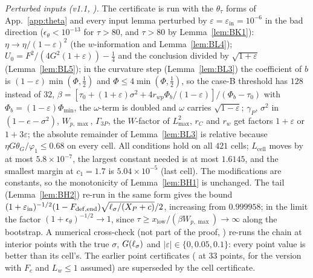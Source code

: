 \emph{Perturbed inputs (v1.1, ).} The certificate is run with the $\theta_\tau$ forms of App.~\ref{app:theta} and every input lemma
perturbed by $\varepsilon=\varepsilon_{\mathrm{in}}=10^{-6}$ in the bad direction ($\epsilon_\theta<10^{-13}$ for $\tau>80$, and $\tau>80$ by Lemma~\ref{lem:BK1}):
$\eta\to\eta/(1-\varepsilon)^2$ (the $w$-information and Lemma~\ref{lem:BL4}); $U_0=F^2/(4G^2(1+\varepsilon))-\frac14$ and the conclusion divided by
$\sqrt{1+\varepsilon}$ (Lemma~\ref{lem:BL5}); in the curvature step (Lemma~\ref{lem:BL3}) the coefficient of $b$ is $(1-\varepsilon)\min(\Phi,\frac12)$ and
$\Phi\le4\min(\Phi,\frac12)$, so the case-B threshold has $128$ instead of $32$, $\beta=[\tau_0+(1+\varepsilon)\sigma^2+4r_{wp}\Phi_{b}/(1-\varepsilon)]/(\Phi_b-\tau_0)$
with $\Phi_b=(1-\varepsilon)\Phi_{\min}$, the $\omega$-term is doubled and $\omega$ carries $\sqrt{1-\varepsilon}$; $\gamma_P$, $\sigma^2$ in $(1-e-\sigma^2)$, $W_{p,\max}$,
$\Gamma_{3P}$, the $W$-factor of $L^2_{\max}$, $r_C$ and $r_w$ get factors $1+\varepsilon$ or $1+3\varepsilon$; the absolute remainder of Lemma~\ref{lem:BL3} is
relative because $\eta G\theta_G/\varphi_1\le0.68$ on every cell. All conditions hold on all $421$ cells; $L_{\mathrm{cell}}$ moves by at most $5.8\times10^{-7}$,
the largest constant needed is at most $1.6145$, and the smallest margin at $c_1=1.7$ is $5.04\times10^{-5}$ (last cell). The modifications are constants, so the
monotonicity of Lemma~\ref{lem:BH1} is unchanged. The tail (Lemma~\ref{lem:BH2}) re-run in the same form gives the bound
$(1+\varepsilon_{\mathrm{in}})^{-1/2}(1-F_{\mathrm{def,end}})\sqrt{\ell_\sigma/(X_P+c)}/2$, increasing from $0.999958$; in the limit the factor
$(1+\epsilon_\theta)^{-1/2}\to1$, since $\tau\ge x_{\mathrm{low}}/(\beta W_{p,\max})\to\infty$ along the bootstrap.
A numerical cross-check (not part of the proof, ) re-runs the chain at interior points with the true $\sigma$, $G(\ell_\sigma)$
and $|\varepsilon|\in\{0,0.05,0.1\}$: every point value is better than its cell's. The earlier point certificates ( at $33$ points,
 for the version with $F_c$ and $L_w\le1$ assumed) are superseded by the cell certificate.

